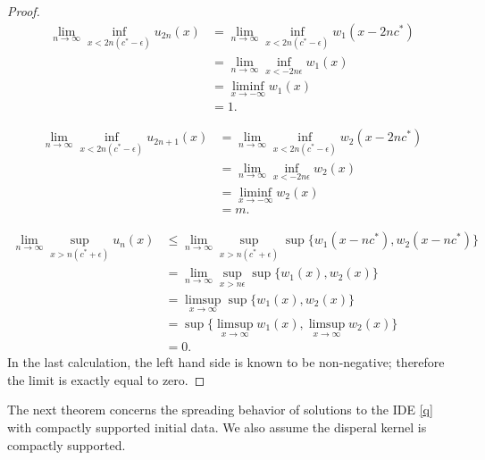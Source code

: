 \documentclass[11pt]{article}
\newtheorem{lem}[thm]{Lemma}
\theoremstyle{definition}
\numberwithin{equation}{section}
\numberwithin{thm}{section}
\begin{document}
\begin{proof}
\begin{equation} \begin{aligned}
\lim_{n\to\infty}\inf_{x<2n(c^*-\epsilon)}u_{2n}(x)
&= \lim_{n\to\infty}\inf_{x<2n(c^*-\epsilon)}w_1(x-2nc^*) \\
&= \lim_{n\to\infty}\inf_{x<-2n\epsilon}w_1(x) \\
&= \liminf_{x\to-\infty}w_1(x) \\ &= 1.
\end{aligned} \end{equation}

\begin{equation} \begin{aligned}
\lim_{n\to\infty}\inf_{x<2n(c^*-\epsilon)}u_{2n+1}(x)
&= \lim_{n\to\infty}\inf_{x<2n(c^*-\epsilon)}w_2(x-2nc^*) \\
&= \lim_{n\to\infty}\inf_{x<-2n\epsilon}w_2(x) \\
&= \liminf_{x\to-\infty}w_2(x) \\ &= m.
\end{aligned} \end{equation}

\begin{equation} \begin{aligned}
\lim_{n\to\infty} \sup_{x>n(c^*+\epsilon)} u_n(x) 
&\leq \lim_{n\to\infty} \sup_{x>n(c^*+\epsilon)} \sup\{w_1(x-nc^*),w_2(x-nc^*)\} \\
&= \lim_{n\to\infty} \sup_{x>n\epsilon} \sup\{w_1(x),w_2(x)\} \\
&= \limsup_{x\to\infty} \sup\{w_1(x),w_2(x)\} \\ 
&= \sup\{\limsup_{x\to\infty} w_1(x),\limsup_{x\to\infty} w_2(x)\} \\
&= 0.
\end{aligned} \end{equation}
In the last calculation, the left hand side is known to be non-negative; therefore the limit is exactly equal to zero.
\end{proof}

The next theorem concerns the spreading behavior of solutions to the IDE \eqref{q} with compactly supported initial data. We also assume the disperal kernel is compactly supported.%

%
\end{document}
